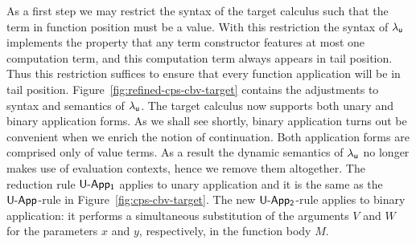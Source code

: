 \documentclass[12pt,phd,lfcs,twoside,openright,logo,leftchapter,normalheadings]{infthesis}
\theoremstyle{plain}
\theoremstyle{definition}
\begin{document}
As a first step we may restrict the syntax of the target calculus such
that the term in function position must be a value. With this
restriction the syntax of $\lambda_{\mathsf{u}}$ implements the property that any
term constructor features at most one computation term, and this
computation term always appears in tail position. Thus this
restriction suffices to ensure that every function application will be
in tail position.
%
Figure~\ref{fig:refined-cps-cbv-target} contains the adjustments to
syntax and semantics of $\lambda_{\mathsf{u}}$. The target calculus now supports
both unary and binary application forms. As we shall see shortly,
binary application turns out be convenient when we enrich the notion
of continuation. Both application forms are comprised only of value
terms. As a result the dynamic semantics of $\lambda_{\mathsf{u}}$ no longer makes
use of evaluation contexts, hence we remove them altogether. The
reduction rule $\mathsf{U\textrm{-}App_1}$ applies to unary application and it
is the same as the $\mathsf{U\textrm{-}App}$-rule in
Figure~\ref{fig:cps-cbv-target}. The new $\mathsf{U\textrm{-}App_2}$-rule
applies to binary application: it performs a simultaneous substitution
of the arguments $V$ and $W$ for the parameters $x$ and $y$,
respectively, in the function body $M$.
%
\end{document}
